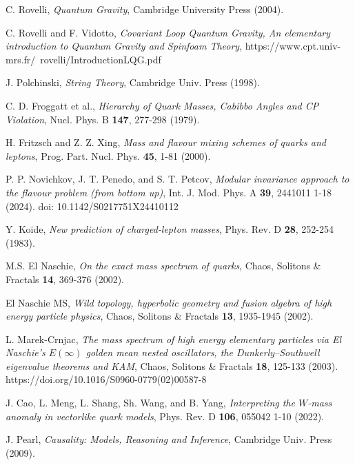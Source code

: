\documentclass[%
 amsmath,amssymb,
 aps,
prb,
floatfix, showkeys
]{revtex4-2}
\begin{document}
\begin{thebibliography}{99}
  C. Rovelli, {\it Quantum Gravity}, Cambridge University Press (2004).

C. Rovelli and F. Vidotto, {\it Covariant Loop Quantum Gravity, An elementary introduction to Quantum Gravity and
  Spinfoam Theory}, https://www.cpt.univ-mrs.fr/~rovelli/IntroductionLQG.pdf

    J. Polchinski, {\it String Theory}, Cambridge Univ. Press (1998).

  C. D. Froggatt et al.,
{\it Hierarchy of Quark Masses, Cabibbo Angles and CP Violation},
  Nucl. Phys. B {\bf 147}, 277-298 (1979).

  H. Fritzsch and  Z. Z. Xing,
  { \it Mass and flavour mixing schemes of quarks and leptons},
  Prog. Part. Nucl. Phys. {\bf 45}, 1-81 (2000).

 P. P. Novichkov,  J. T. Penedo, and  S. T. Petcov, 
    {\it Modular invariance approach to the flavour problem (from bottom up)},
    Int. J. Mod. Phys. A {\bf 39},  2441011 1-18  (2024). doi: 10.1142/S0217751X24410112
    
  Y. Koide, {\it New prediction of charged‐lepton masses},
  Phys. Rev. D {\bf 28},  252-254 (1983). 

  M.S. El Naschie,
  {\it On the exact mass spectrum of quarks}, 
Chaos, Solitons \& Fractals {\bf  14}, 369-376  (2002).

El Naschie MS,
{\it Wild topology, hyperbolic geometry and fusion algebra of high energy particle physics},
 Chaos, Solitons \& Fractals {\bf 13}, 1935-1945 (2002).

L.  Marek-Crnjac,
{ \it The mass spectrum of high energy elementary particles via El Naschie’s
 $E(\infty)$ golden mean nested oscillators, the Dunkerly–Southwell eigenvalue theorems and KAM},
  Chaos, Solitons \& Fractals  {\bf 18},  125-133 (2003).
https://doi.org/10.1016/S0960-0779(02)00587-8

  J. Cao, L. Meng, L.  Shang, Sh.  Wang, and B.  Yang,
{\it  Interpreting the $W$-mass anomaly in vectorlike quark models},  
 Phys. Rev. D {\bf 106}, 055042  1-10 (2022).

J. Pearl, {\it Causality: Models, Reasoning and Inference}, Cambridge Univ. Press (2009). 


\end{thebibliography}
\end{document}
